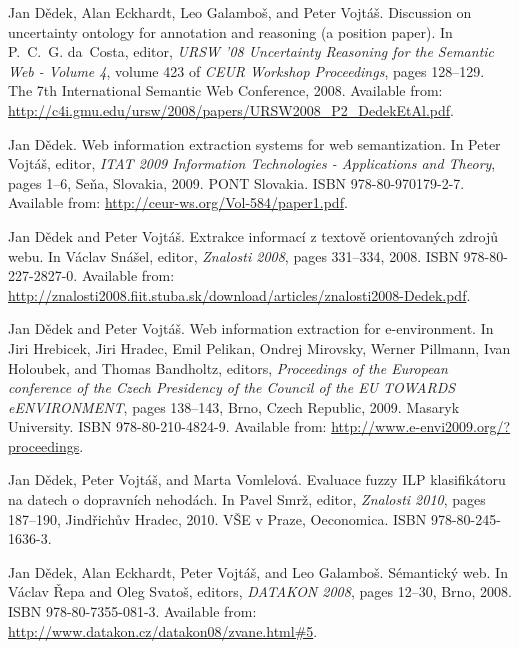 \begin{description}
\item
Jan D{\v{e}}dek, Alan Eckhardt, Leo Galambo{\v{s}}, and Peter
  Vojt{\'{a}}{\v{s}}.
\newblock Discussion on uncertainty ontology for annotation and reasoning (a
  position paper).
\newblock In P.~C.~G. da~Costa, editor, {\em {URSW} '08 Uncertainty Reasoning
  for the Semantic Web - Volume 4}, volume 423 of {\em {CEUR} Workshop
  Proceedings}, pages 128--129. The 7th International Semantic Web Conference,
  2008.
\newblock Available from:
  \url{http://c4i.gmu.edu/ursw/2008/papers/URSW2008_P2_DedekEtAl.pdf}.


\item
Jan D{\v{e}}dek.
\newblock Web information extraction systems for web semantization.
\newblock In Peter Vojt{\'{a}}{\v{s}}, editor, {\em {ITAT} 2009 Information
  Technologies - Applications and Theory}, pages 1--6, Se{\v{n}}a, Slovakia,
  2009. {PONT} Slovakia.
\newblock ISBN 978-80-970179-2-7.
\newblock Available from: \url{http://ceur-ws.org/Vol-584/paper1.pdf}.


\item
Jan D{\v{e}}dek and Peter Vojt{\'{a}}{\v{s}}.
\newblock Extrakce informac{\'{i}} z textov{\v{e}} orientovan{\'{y}}ch
  zdroj{\r{u}} webu.
\newblock In V{\'{a}}clav Sn{\'{a}}{\v{s}}el, editor, {\em Znalosti 2008},
  pages 331--334, 2008.
\newblock ISBN 978-80-227-2827-0.
\newblock Available from:
  \url{http://znalosti2008.fiit.stuba.sk/download/articles/znalosti2008-Dedek.pdf}.


\item
Jan D{\v{e}}dek and Peter Vojt{\'{a}}{\v{s}}.
\newblock Web information extraction for e-environment.
\newblock In Jiri Hrebicek, Jiri Hradec, Emil Pelikan, Ondrej Mirovsky, Werner
  Pillmann, Ivan Holoubek, and Thomas Bandholtz, editors, {\em Proceedings of
  the European conference of the Czech Presidency of the Council of the {EU
  TOWARDS eENVIRONMENT}}, pages 138--143, Brno, Czech Republic, 2009. Masaryk
  University.
\newblock ISBN 978-80-210-4824-9.
\newblock Available from: \url{http://www.e-envi2009.org/?proceedings}.


\item
Jan D{\v{e}}dek, Peter Vojt{\'{a}}{\v{s}}, and Marta Vomlelov{\'{a}}.
\newblock Evaluace fuzzy {ILP} klasifik{\'{a}}toru na datech o dopravn{\'{i}}ch
  nehod{\'{a}}ch.
\newblock In Pavel Smr{\v{z}}, editor, {\em Znalosti 2010}, pages 187--190,
  Jind{\v{r}}ich{\r{u}}v Hradec, 2010. V{\v{S}}E v Praze, Oeconomica.
\newblock ISBN 978-80-245-1636-3.

\item
Jan D{\v{e}}dek, Alan Eckhardt, Peter Vojt{\'{a}}{\v{s}}, and Leo
  Galambo{\v{s}}.
\newblock S{\'{e}}mantick{\'{y}} web.
\newblock In V{\'{a}}clav {\v{R}}epa and Oleg Svato{\v{s}}, editors, {\em
  {DATAKON} 2008}, pages 12--30, Brno, 2008.
\newblock ISBN 978-80-7355-081-3.
\newblock Available from: \url{http://www.datakon.cz/datakon08/zvane.html#5}.



\end{description}
